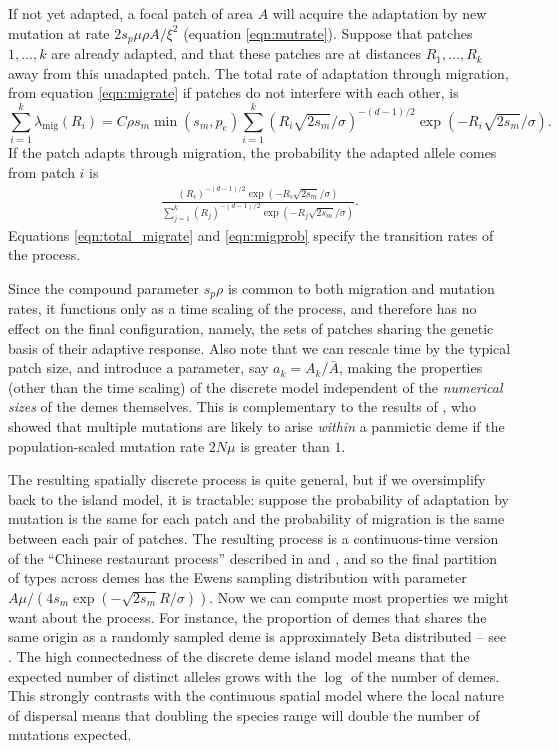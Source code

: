 \documentclass{article}
\newcommand{\linelabel}[1]{}
\newcommand{\citet}[1]{\cite{#1}}
\newcommand{\migrate}{\lambda_\text{mig}}
\begin{document}
If not yet adapted, a focal patch of area $A$ will acquire the adaptation by new mutation at rate $2 s_p \mu \rho A/\xi^2$ (equation \eqref{eqn:mutrate}).
Suppose that patches $1, \ldots, k$ are already adapted,
and that these patches are at distances $R_1, \ldots, R_k$ away from this unadapted patch.
The total rate of adaptation through migration, from equation \eqref{eqn:migrate}
if patches do not interfere with each other, \linelabel{rr:interference}
is
\begin{equation} \label{eqn:total_migrate}
    \sum_{i=1}^k \migrate(R_i) = C \rho s_m \min(s_m,p_e) \sum_{i=1}^{k} \left(R_i \sqrt{2 s_m} /\sigma \right)^{-(d-1)/2} \exp\left(- R_i \sqrt{2 s_m} /\sigma\right).
\end{equation}
If the patch adapts through migration, the probability the adapted allele 
comes from patch $i$ is 
\begin{align}   \label{eqn:migprob}
  \frac{
      \left(R_i \right)^{-(d-1)/2} \exp\left(- R_i \sqrt{2 s_m} 
      /\sigma\right)
  } {
      \sum_{j=1}^{k}  \left(R_j \right)^{-(d-1)/2} \exp\left(- R_j \sqrt{2 s_m}
    /\sigma\right) 
} .
\end{align}
Equations \eqref{eqn:total_migrate} and \eqref{eqn:migprob} specify the transition rates of the process.

Since the compound parameter $s_p \rho$ is common to both migration and mutation rates,
it functions only as a time scaling of the process, 
and therefore has no effect on the final configuration, namely, 
the sets of patches sharing the genetic basis of their adaptive response.
Also note that we can rescale time by the typical patch size, and introduce a parameter, say $a_k = A_k/\bar A$,
making the properties (other than the time scaling) of the discrete model independent of the \emph{numerical sizes} of the demes themselves.
This is complementary to the results of \cite{softsweepsII}, who showed that multiple mutations are likely to arise \emph{within} a panmictic deme
if the population-scaled mutation rate $2 N \mu$ is greater than $1$.

The resulting spatially discrete process is quite general,
but if we oversimplify back to the island model, it is tractable:
suppose the probability of adaptation by mutation is the same for each patch
and the probability of migration is the same between each pair of patches.
The resulting process is a continuous-time version of the ``Chinese restaurant process''
described in \citet{aldous1985exchangeability} and \citet{pitman1995partitions},
and so the final partition of types across demes has the Ewens
sampling distribution with parameter $A \mu / (4 s_m \exp (-\sqrt{2 s_m}R/\sigma))$.
Now we can compute most properties we might want about the process.
For instance, the proportion of demes that shares the same origin as a randomly sampled deme
is approximately Beta distributed -- see \cite{donnelly1989continuity}.
The high connectedness of the discrete deme island model means that the expected number of distinct alleles
grows with the $\log$ of the number of demes.
This strongly contrasts with the continuous spatial model 
where the local nature of dispersal means that doubling the species range will double the number of mutations expected. 
\end{document}
